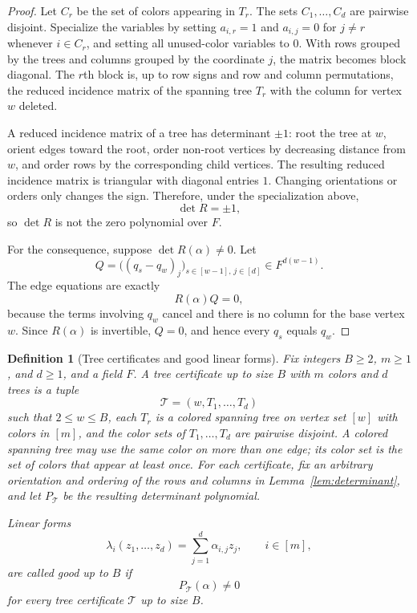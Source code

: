 \documentclass[10pt,a4paper]{amsart}
\newtheorem{definition}[theorem]{Definition}
\begin{document}
\begin{proof}
Let \(C_r\) be the set of colors appearing in \(T_r\). The sets \(C_1,\ldots,C_d\) are pairwise disjoint. Specialize the variables by setting \(a_{i,r}=1\) and \(a_{i,j}=0\) for \(j\ne r\) whenever \(i\in C_r\), and setting all unused-color variables to \(0\). With rows grouped by the trees and columns grouped by the coordinate \(j\), the matrix becomes block diagonal. The \(r\)th block is, up to row signs and row and column permutations, the reduced incidence matrix of the spanning tree \(T_r\) with the column for vertex \(w\) deleted.

A reduced incidence matrix of a tree has determinant \(\pm1\): root the tree at \(w\), orient edges toward the root, order non-root vertices by decreasing distance from \(w\), and order rows by the corresponding child vertices. The resulting reduced incidence matrix is triangular with diagonal entries \(1\). Changing orientations or orders only changes the sign. Therefore, under the specialization above,
\[
\det R=\pm1,
\]
so \(\det R\) is not the zero polynomial over \(F\).

For the consequence, suppose \(\det R(\alpha)\ne0\). Let
\[
Q=\bigl((q_s-q_w)_j\bigr)_{s\in[w-1],\,j\in[d]}\in F^{d(w-1)}.
\]
The edge equations are exactly
\[
R(\alpha)Q=0,
\]
because the terms involving \(q_w\) cancel and there is no column for the base vertex \(w\). Since \(R(\alpha)\) is invertible, \(Q=0\), and hence every \(q_s\) equals \(q_w\).
\end{proof}

\begin{definition}[Tree certificates and good linear forms]\label{def:good}
Fix integers \(B\ge2\), \(m\ge1\), and \(d\ge1\), and a field \(F\). A tree certificate up to size \(B\) with \(m\) colors and \(d\) trees is a tuple
\[
\mathcal T=(w,T_1,\ldots,T_d)
\]
such that \(2\le w\le B\), each \(T_r\) is a colored spanning tree on vertex set \([w]\) with colors in \([m]\), and the color sets of \(T_1,\ldots,T_d\) are pairwise disjoint. 
A colored spanning tree may use the same color on more than one edge; its color set is the set of colors that appear at least once.
For each certificate, fix an arbitrary orientation and ordering of the rows and columns in Lemma~\ref{lem:determinant}, and let \(P_{\mathcal T}\) be the resulting determinant polynomial.

Linear forms
\[
\lambda_i(z_1,\ldots,z_d)=\sum_{j=1}^d \alpha_{i,j}z_j,
\qquad i\in[m],
\]
are called good up to \(B\) if
\[
P_{\mathcal T}(\alpha)\ne0
\]
for every tree certificate \(\mathcal T\) up to size \(B\).
\end{definition}
\end{document}
